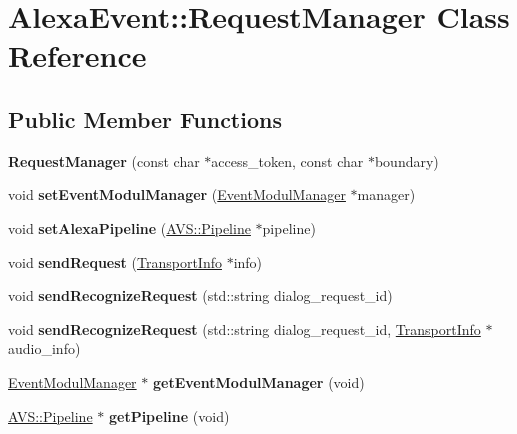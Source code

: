 \hypertarget{classAlexaEvent_1_1RequestManager}{}\section{Alexa\+Event\+:\+:Request\+Manager Class Reference}
\label{classAlexaEvent_1_1RequestManager}
\subsection*{Public Member Functions}
\begin{DoxyCompactItemize}
\item 
\mbox{\label{classAlexaEvent_1_1RequestManager_acd5c184eea921b13cb7f5b41ae7d172d}} 
{\bfseries Request\+Manager} (const char $\ast$access\+\_\+token, const char $\ast$boundary)
\item 
\mbox{\label{classAlexaEvent_1_1RequestManager_a2ec7bdb5fd4542c4dcfb33c6c6b2aaf1}} 
void {\bfseries set\+Event\+Modul\+Manager} (\hyperlink{classAlexaEvent_1_1EventModulManager}{Event\+Modul\+Manager} $\ast$manager)
\item 
\mbox{\label{classAlexaEvent_1_1RequestManager_a3ac3a4d8ca4ba738bc6f0f6a362f6a4e}} 
void {\bfseries set\+Alexa\+Pipeline} (\hyperlink{classAVS_1_1Pipeline}{A\+V\+S\+::\+Pipeline} $\ast$pipeline)
\item 
\mbox{\label{classAlexaEvent_1_1RequestManager_abbfc826e89633c1faea3d3b938a9dd78}} 
void {\bfseries send\+Request} (\hyperlink{classAlexaEvent_1_1TransportInfo}{Transport\+Info} $\ast$info)
\item 
\mbox{\label{classAlexaEvent_1_1RequestManager_adef3c1fcf5c4d16645b5274e3424ca22}} 
void {\bfseries send\+Recognize\+Request} (std\+::string dialog\+\_\+request\+\_\+id)
\item 
\mbox{\label{classAlexaEvent_1_1RequestManager_a5d4724b2a5dc23874d0066b4f51cfbf8}} 
void {\bfseries send\+Recognize\+Request} (std\+::string dialog\+\_\+request\+\_\+id, \hyperlink{classAlexaEvent_1_1TransportInfo}{Transport\+Info} $\ast$audio\+\_\+info)
\item 
\mbox{\label{classAlexaEvent_1_1RequestManager_a1919f65d403beba9d7e361358dce36ff}} 
\hyperlink{classAlexaEvent_1_1EventModulManager}{Event\+Modul\+Manager} $\ast$ {\bfseries get\+Event\+Modul\+Manager} (void)
\item 
\mbox{\label{classAlexaEvent_1_1RequestManager_a16badb384262fd52dc7942415a63204b}} 
\hyperlink{classAVS_1_1Pipeline}{A\+V\+S\+::\+Pipeline} $\ast$ {\bfseries get\+Pipeline} (void)
\end{DoxyCompactItemize}


